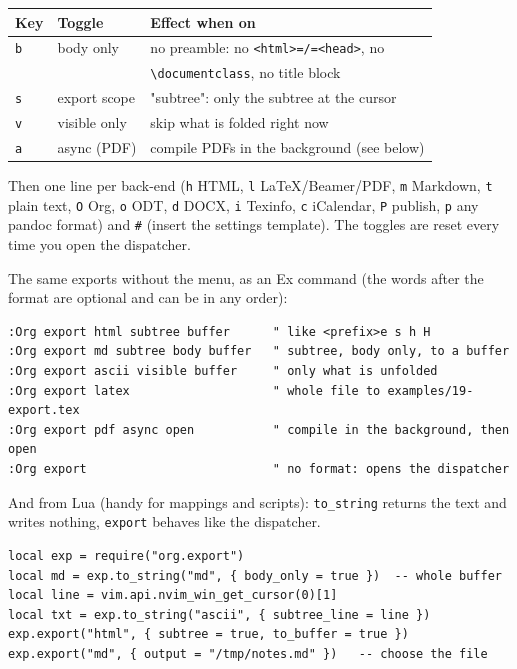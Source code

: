 \begin{center}
\begin{tabular}{lll}
Key & Toggle & Effect when on\\
\hline
\texttt{b} & body only & no preamble: no \texttt{<html>=/=<head>}, no\\
 &  & \texttt{\textbackslash{}documentclass}, no title block\\
\texttt{s} & export scope & "subtree": only the subtree at the cursor\\
\texttt{v} & visible only & skip what is folded right now\\
\texttt{a} & async (PDF) & compile PDFs in the background (see below)\\
\end{tabular}
\end{center}

Then one line per back-end (\texttt{h} HTML, \texttt{l} \LaTeX{}/Beamer/PDF, \texttt{m} Markdown,
\texttt{t} plain text, \texttt{O} Org, \texttt{o} ODT, \texttt{d} DOCX, \texttt{i} Texinfo, \texttt{c} iCalendar,
\texttt{P} publish, \texttt{p} any pandoc format) and \texttt{\#} (insert the settings template).
The toggles are reset every time you open the dispatcher.

The same exports without the menu, as an Ex command (the words after the
format are optional and can be in any order):

\begin{verbatim}
:Org export html subtree buffer      " like <prefix>e s h H
:Org export md subtree body buffer   " subtree, body only, to a buffer
:Org export ascii visible buffer     " only what is unfolded
:Org export latex                    " whole file to examples/19-export.tex
:Org export pdf async open           " compile in the background, then open
:Org export                          " no format: opens the dispatcher
\end{verbatim}

And from Lua (handy for mappings and scripts): \texttt{to\_string} returns the text
and writes nothing, \texttt{export} behaves like the dispatcher.

\begin{verbatim}
local exp = require("org.export")
local md = exp.to_string("md", { body_only = true })  -- whole buffer
local line = vim.api.nvim_win_get_cursor(0)[1]
local txt = exp.to_string("ascii", { subtree_line = line })
exp.export("html", { subtree = true, to_buffer = true })
exp.export("md", { output = "/tmp/notes.md" })   -- choose the file
\end{verbatim}
